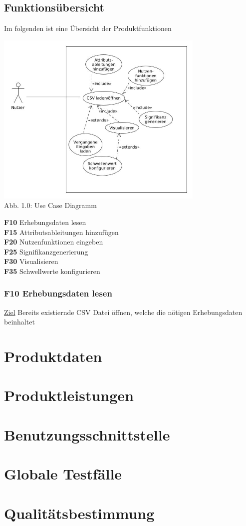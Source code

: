 \documentclass{article}
\begin{document}
\subsection{Funktionsübersicht}
Im folgenden ist eine Übersicht der Produktfunktionen
\begin{center}
\includegraphics[width=10cm]{use case2.jpg}\\ 
\caption{Abb. 1.0: Use Case Diagramm} 
\end{center} 
\textbf{F10} Erhebungsdaten lesen \\
\textbf{F15} Attributsableitungen hinzufügen \\
\textbf{F20} Nutzenfunktionen eingeben \\
\textbf{F25} Signifikanzgenerierung \\
\textbf{F30} Visualisieren \\
\textbf{F35} Schwellwerte konfigurieren
\subsubsection*{F10 Erhebungsdaten lesen}
\underline {Ziel}   Bereits existiernde CSV Datei öffnen, welche die nötigen Erhebungsdaten beinhaltet

\section{Produktdaten}

\section{Produktleistungen}

\section{Benutzungsschnittstelle}

\section{Globale Testfälle}

\section{Qualitätsbestimmung}
\end{document}

